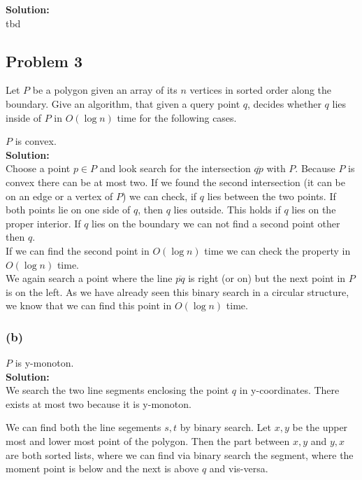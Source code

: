 \documentclass[11pt,a4paper,ngerman]{article}
\begin{document}
\textbf{Solution:}\\

tbd

\subsection*{Problem 3}

Let $P$ be a polygon given an array of its $n$ vertices in sorted order along the boundary. Give an algorithm, that given a query point $q$, decides
whether $q$ lies inside of $P$ in $O(\log n)$ time for the following cases.


$P$ is convex.\\

\textbf{Solution:}\\

Choose a point $p \in P$ and look search for the intersection $\overline{qp}$ with $P$. Because $P$ is convex there can be at most two.
If we found the second intersection (it can be on an edge or a vertex of $P$) we can check, if $q$ lies between the two points.
If both points lie on one side of $q$, then $q$ lies outside. This holds if $q$ lies on the proper interior. If $q$ lies on the boundary
we can not find a second point other then $q$.\\

If we can find the second point in $O(\log n)$ time we can check the property in $O(\log n)$ time.\\

We again search a point where the line $\overline{pq}$ is right (or on) but the next point in $P$ is on the left. As we have already seen
this binary search in a circular structure, we know that we can find this point in $O(\log n)$ time.

\subsubsection*{(b)}

$P$ is y-monoton.\\

\textbf{Solution:}\\

We search the two line segments enclosing the point $q$ in y-coordinates. There exists at most two because it is y-monoton.

We can find both the line segements $s,t$ by binary search. Let $x,y$ be the upper most and lower most point of the polygon.
Then the part between $x,y$ and $y,x$ are both sorted lists, where we can find via binary search the segment, where
the moment point is below and the next is above $q$ and vis-versa.
\end{document}
